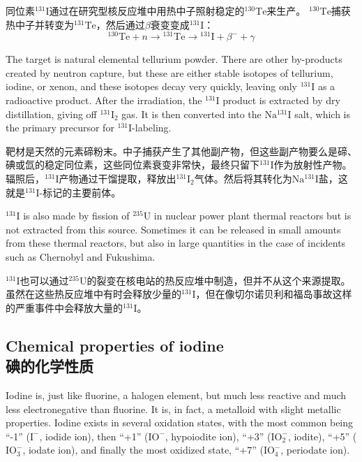 \documentclass[dvipsnames, svgnames,a4paper,11pt]{article}
\begin{document}
同位素\(\mathrm{^{131}I}\)通过在研究型核反应堆中用热中子照射稳定的\(\mathrm{^{130}Te}\)来生产。 \(\mathrm{^{130}Te}\)捕获热中子并转变为\(\mathrm{^{131}Te}\)，然后通过\(\beta\)衰变变成\(\mathrm{^{131}I}\)：
\[
\mathrm{^{130}Te} + n \rightarrow \mathrm{^{131}Te} \rightarrow \mathrm{^{131}I} + \beta^- + \gamma
\]

The target is natural elemental tellurium powder. There are other by-products created by neutron capture, but these are either stable isotopes of tellurium, iodine, or xenon, and these isotopes decay very quickly, leaving only \(\mathrm{^{131}I}\) as a radioactive product. After the irradiation, the \(\mathrm{^{131}I}\) product is extracted by dry distillation, giving off \(\mathrm{^{131}I_2}\) gas. It is then converted into the \(\mathrm{Na^{131}I}\) salt, which is the primary precursor for \(\mathrm{^{131}I}\)-labeling.

靶材是天然的元素碲粉末。中子捕获产生了其他副产物，但这些副产物要么是碲、碘或氙的稳定同位素，这些同位素衰变非常快，最终只留下\(\mathrm{^{131}I}\)作为放射性产物。辐照后，\(\mathrm{^{131}I}\)产物通过干馏提取，释放出\(\mathrm{^{131}I_2}\)气体。然后将其转化为\(\mathrm{Na^{131}I}\)盐，这就是\(\mathrm{^{131}I}\)-标记的主要前体。

\(\mathrm{^{131}I}\) is also made by fission of \(\mathrm{^{235}U}\) in nuclear power plant thermal reactors but is not extracted from this source. Sometimes it can be released in small amounts from these thermal reactors, but also in large quantities in the case of incidents such as Chernobyl and Fukushima.

\(\mathrm{^{131}I}\)也可以通过\(\mathrm{^{235}U}\)的裂变在核电站的热反应堆中制造，但并不从这个来源提取。虽然在这些热反应堆中有时会释放少量的\(\mathrm{^{131}I}\)，但在像切尔诺贝利和福岛事故这样的严重事件中会释放大量的\(\mathrm{^{131}I}\)。

\subsection{Chemical properties of iodine\\ 碘的化学性质}  
Iodine is, just like fluorine, a halogen element, but much less reactive and much less electronegative than fluorine. It is, in fact, a metalloid with slight metallic properties. Iodine exists in several oxidation states, with the most common being “-1” (\(\mathrm{I^-}\), iodide ion), then “+1” (\(\mathrm{IO^-}\), hypoiodite ion), “+3” (\(\mathrm{IO_2^-}\), iodite), “+5” (\(\mathrm{IO_3^-}\), iodate ion), and finally the most oxidized state, “+7” (\(\mathrm{IO_4^-}\), periodate ion).  
\end{document}
